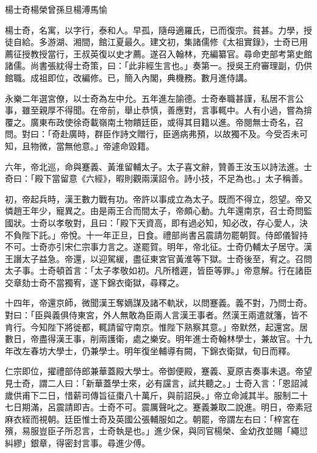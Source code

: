 
\begin{pinyinscope}
楊士奇楊榮曾孫旦楊溥馬愉

楊士奇，名寓，以字行，泰和人。早孤，隨母適羅氏，已而復宗。貧甚。力學，授徒自給。多游湖、湘間，館江夏最久。建文初，集諸儒修《太祖實錄》，士奇已用薦征授教授當行，王叔英復以史才薦。遂召入翰林，充編纂官。尋命吏部考第史館諸儒。尚書張紞得士奇策，曰：「此非經生言也。」奏第一。授吳王府審理副，仍供館職。成祖即位，改編修。已，簡入內閣，典機務。數月進侍講。

永樂二年選宮僚，以士奇為左中允。五年進左諭德。士奇奉職甚謹，私居不言公事，雖至親厚不得聞。在帝前，舉止恭慎，善應對，言事輒中。人有小過，嘗為揜覆之。廣東布政使徐奇載嶺南土物饋廷臣，或得其目籍以進。帝閱無士奇名，召問。對曰：「奇赴廣時，群臣作詩文贈行，臣適病弗預，以故獨不及。今受否未可知，且物微，當無他意。」帝遽命毀籍。

六年，帝北巡，命與蹇義、黃淮留輔太子。太子喜文辭，贊善王汝玉以詩法進。士奇曰：「殿下當留意《六經》，暇則觀兩漢詔令。詩小技，不足為也。」太子稱善。

初，帝起兵時，漢王數力戰有功。帝許以事成立為太子。既而不得立，怨望。帝又憐趙王年少，寵異之。由是兩王合而間太子，帝頗心動。九年還南京，召士奇問監國狀。士奇以孝敬對，且曰：「殿下天資高，即有過必知，知必改，存心愛人，決不負陛下託。」帝悅。十一年正旦，日食。禮部尚書呂震請勿罷朝賀。侍郎儀智持不可。士奇亦引宋仁宗事力言之。遂罷賀。明年，帝北征。士奇仍輔太子居守。漢王譖太子益急。帝還，以迎駕緩，盡征東宮官黃淮等下獄。士奇後至，宥之。召問太子事。士奇頓首言：「太子孝敬如初。凡所稽遲，皆臣等罪。」帝意解。行在諸臣交章劾士奇不當獨宥，遂下錦衣衛獄，尋釋之。

十四年，帝還京師，微聞漢王奪嫡謀及諸不軌狀，以問蹇義。義不對，乃問士奇。對曰：「臣與義俱侍東宮，外人無敢為臣兩人言漢王事者。然漢王兩遣就籓，皆不肯行。今知陛下將徙都，輒請留守南京。惟陛下熟察其意。」帝默然，起還宮。居數日，帝盡得漢王事，削兩護衛，處之樂安。明年進士奇翰林學士，兼故官。十九年改左春坊大學士，仍兼學士。明年復坐輔導有闕，下錦衣衛獄，旬日而釋。

仁宗即位，擢禮部侍郎兼華蓋殿大學士。帝御便殿，蹇義、夏原吉奏事未退。帝望見士奇，謂二人曰：「新華蓋學士來，必有讜言，試共聽之。」士奇入言：「恩詔減歲供甫下二日，惜薪司傳旨征棗八十萬斤，與前詔戾。」帝立命減其半。服制二十七日期滿，呂震請即吉。士奇不可。震厲聲叱之。蹇義兼取二說進。明日，帝素冠麻衣絰而視朝。廷臣惟士奇及英國公張輔服如之。朝罷，帝謂左右曰：「梓宮在殯，易服豈臣子所忍言，士奇執是也。」進少保，與同官楊榮、金幼孜並賜「繩愆糾繆」銀章，得密封言事。尋進少傅。


\end{pinyinscope}
